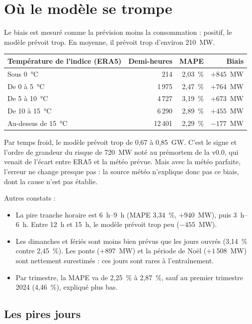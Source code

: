 \documentclass[11pt,a4paper]{article}
\begin{document}
\section{Où le modèle se trompe}

Le biais est mesuré comme la prévision moins la consommation : positif, le modèle prévoit trop. En moyenne, il prévoit trop d'environ 210~MW.

\begin{table}[H]
\small
\begin{tabularx}{\linewidth}{Yrrr}
\toprule
\textbf{Température de l'indice (ERA5)} & \textbf{Demi-heures} & \textbf{MAPE} & \textbf{Biais} \\
\midrule
Sous 0~°C & 214 & 2,03~\% & $+845$~MW \\
De 0 à 5~°C & 1\,975 & 2,47~\% & $+764$~MW \\
De 5 à 10~°C & 4\,727 & 3,19~\% & $+673$~MW \\
De 10 à 15~°C & 6\,290 & 2,89~\% & $+455$~MW \\
Au-dessus de 15~°C & 12\,401 & 2,29~\% & $-177$~MW \\
\bottomrule
\end{tabularx}
\end{table}

Par temps froid, le modèle prévoit trop de 0,67 à 0,85~GW. C'est le signe et l'ordre de grandeur du risque de 720~MW noté au prémortem de la v0.0, qui venait de l'écart entre ERA5 et la météo prévue. Mais avec la météo parfaite, l'erreur ne change presque pas : la source météo n'explique donc pas ce biais, dont la cause n'est pas établie.

Autres constats :

\begin{itemize}
  \item La pire tranche horaire est 6~h--9~h (MAPE 3,34~\%, $+940$~MW), puis 3~h--6~h. Entre 12~h et 15~h, le modèle prévoit trop peu ($-455$~MW).
  \item Les dimanches et fériés sont moins bien prévus que les jours ouvrés (3,14~\% contre 2,45~\%). Les ponts ($+897$~MW) et la période de Noël ($+1\,508$~MW) sont nettement surestimés : ces jours sont rares à l'entraînement.
  \item Par trimestre, la MAPE va de 2,25~\% à 2,87~\%, sauf au premier trimestre 2024 (4,46~\%), expliqué plus bas.
\end{itemize}

\subsection{Les pires jours}
\end{document}
